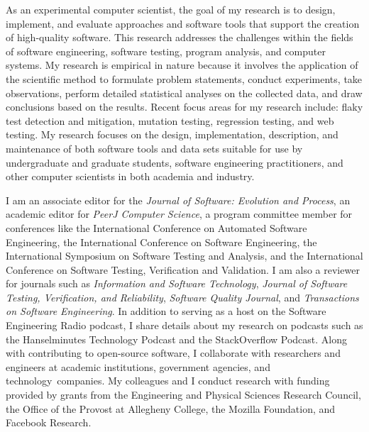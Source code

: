 \documentclass[11pt,letterpaper,sans]{moderncv}
\begin{document}

{\small
  As an experimental computer scientist, the goal of my research is to design,
  implement, and evaluate approaches and software tools that support the
  creation of high-quality software. This research addresses the challenges
  within the fields of software engineering, software testing, program analysis,
  and computer systems. My research is empirical in nature because it involves
  the application of the scientific method to formulate problem statements,
  conduct experiments, take observations, perform detailed statistical analyses
  on the collected data, and draw conclusions based on the results. Recent
  focus areas for my research include: flaky test detection and mitigation,
  mutation testing, regression testing, and web testing. My research
  focuses on the design, implementation, description, and maintenance of both
  software tools and data sets suitable for use by undergraduate and
  graduate students, software engineering practitioners, and other computer
  scientists in both academia and industry.
}

\vspace*{.1in}


{\small
  I am an associate editor for the {\em Journal of Software: Evolution and Process},
  an academic editor for {\em PeerJ Computer Science}, a program
  committee member for conferences like the International Conference on
  Automated Software Engineering, the International Conference on Software
  Engineering, the International Symposium on Software Testing and Analysis, and
  the International Conference on Software Testing, Verification and Validation.
  I am also a reviewer for journals such as {\em Information and Software
  Technology}, {\em Journal of Software Testing, Verification, and Reliability},
  {\em Software Quality Journal}, and {\em Transactions on Software
  Engineering}. In addition to serving as a host on the Software Engineering
  Radio podcast, I share details about my research on podcasts such as the
  Hanselminutes Technology Podcast and the StackOverflow Podcast. Along with
  contributing to open-source software, I collaborate with researchers and
  engineers at academic institutions, government agencies, and
  \mbox{technology companies}. My colleagues and I conduct research with funding
  provided by grants from the Engineering and Physical Sciences Research
  Council, the Office of the Provost at Allegheny College, the Mozilla
  Foundation, and Facebook Research.
}
\end{document}
